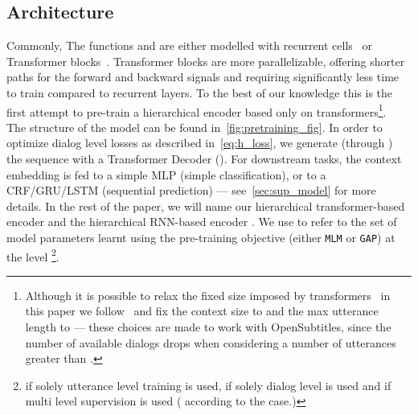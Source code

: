 \documentclass[11pt,a4paper]{article}
\begin{document}
\subsection{Architecture}
Commonly, The functions  and  are either modelled with recurrent cells~\cite{hred} or Transformer blocks~\cite{attention_is}. Transformer blocks are more parallelizable, offering shorter paths for the forward and backward signals and requiring significantly less time to train compared to recurrent layers. To the best of our knowledge this is the first attempt to pre-train a hierarchical encoder based only on transformers\footnote{Although it is possible to relax the fixed size imposed by transformers~\cite{dai2019transformer} in this paper we follow~\cite{colombo2020guiding} and fix the context size to  and the max utterance length to  --- these choices are made to work with OpenSubtitles, since the number of available dialogs drops when considering a number of utterances greater than .}. \\
The structure of the model can be found in~\autoref{fig:pretraining_fig}. In order to optimize dialog level losses as described in~\autoref{eq:h_loss}, we generate (through ) the sequence with a Transformer Decoder ().
For downstream tasks, the context embedding  is fed to a simple MLP (simple classification), or to a CRF/GRU/LSTM (sequential prediction) --- see~\autoref{sec:sup_model} for more details. In the rest of the paper, we will name our hierarchical transformer-based encoder  and the hierarchical RNN-based encoder .
We use  to refer to the set of model parameters learnt using the pre-training objective  (either \texttt{MLM} or \texttt{GAP}) at the level \footnote{if  solely utterance level training is used, if  solely dialog level is used and if  multi level supervision is used ( according to the case.)}.
\end{document}
